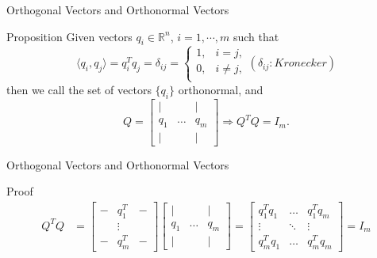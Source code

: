 \documentclass[aspectratio=169]{beamer}
\begin{document}
    \begin{frame}{Orthogonal Vectors and Orthonormal Vectors}
        \begin{block}{Proposition}
        Given vectors $q_i \in \mathbb{R}^n$, $i = 1,\cdots,m$ such that 
        \begin{equation*}
            \langle q_i , q_j \rangle = q_i^T q_j = \delta_{ij} = \left\{ \begin{array}{ll} 
                1, & i = j, \\ 
                0, & i \neq j, \\ 
            \end{array} \right. 
            (\delta_{ij} : Kronecker)
        \end{equation*}
        then we call the set of vectors $\{q_i\}$ orthonormal, and 
        \begin{equation*}
            Q=\left[\begin{array}{ccc}
                \mid & & \mid \\
                q_{1} & \ldots & q_{m} \\
                \mid & & \mid
                \end{array}\right] \Rightarrow Q^TQ = I_{m}.
        \end{equation*}
        \end{block}

    \end{frame}

    \begin{frame}{Orthogonal Vectors and Orthonormal Vectors}
                \begin{block}{Proof} 
        \begin{equation*}
            \begin{aligned}
                Q^{T} Q &=\left[\begin{array}{ccc}
                - & q_{1}^{T} & - \\
                & \vdots & \\
                - & q_{m}^{T} & -
                \end{array}\right]\left[\begin{array}{ccc}
                \mid & & \mid \\
                q_{1} & \ldots & q_{m} \\
                \mid & & \mid
                \end{array}\right]=\left[\begin{array}{ccc}
                q_{1}^{T} q_{1} & \ldots & q_{1}^{T} q_{m} \\
                \vdots & \ddots & \vdots \\
                q_{m}^{T} q_{1} & \ldots & q_{m}^{T} q_{m}
                \end{array}\right] =I_{m}
                \end{aligned}
        \end{equation*}
        \end{block}
    \end{frame}
    
\end{document}
